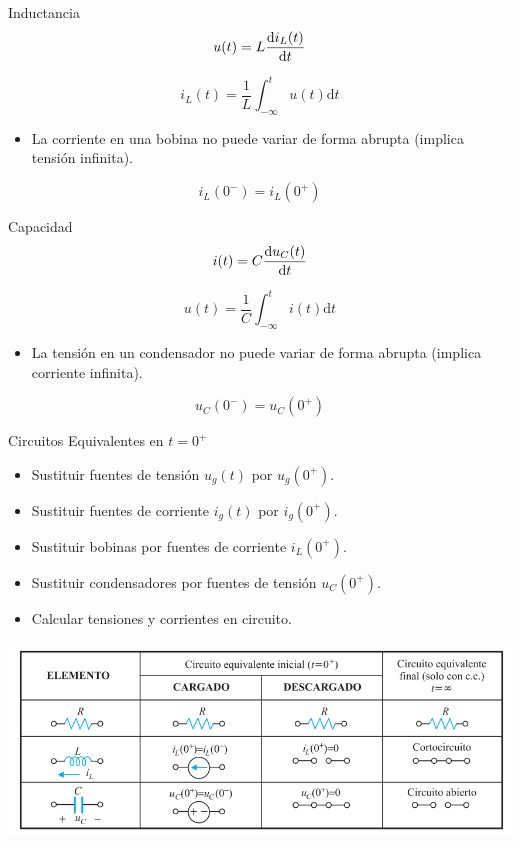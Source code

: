 \documentclass[aspectratio=169, usenames,svgnames,dvipsnames]{beamer}
\begin{document}
\begin{frame}[label={sec:orgce14b8c}]{Inductancia}
\[
u(t) = L \diff{i_L(t)}{t}
\]

\[
i_L(t) = \frac{1}{L} \int^t_{-\infty}u(t) \mathrm{d}t
\]

\begin{itemize}
\item La corriente en una bobina no puede variar de forma abrupta (implica tensión infinita).
\end{itemize}
\[
i_L(0^-) = i_L(0^+)
\]
\end{frame}

\begin{frame}[label={sec:orge9e766b}]{Capacidad}
\[
i(t) = C \diff{u_C(t)}{t}
\]

\[
u(t) = \frac{1}{C} \int^t_{-\infty}i(t) \mathrm{d}t
\]

\begin{itemize}
\item La tensión en un condensador no puede variar de forma abrupta (implica corriente infinita).
\end{itemize}
\[
u_C(0^-) = u_C(0^+)
\]
\end{frame}
\begin{frame}[label={sec:orgc327838}]{Circuitos Equivalentes en \(t = 0^+\)}
\begin{itemize}
\item Sustituir fuentes de tensión \(u_g(t)\) por \(u_g(0^+)\).
\item Sustituir fuentes de corriente \(i_g(t)\) por \(i_g(0^+)\).
\item Sustituir bobinas por fuentes de corriente \(i_L(0^+)\).
\item Sustituir condensadores por fuentes de tensión \(u_C(0^+)\).
\item Calcular tensiones y corrientes en circuito.
\end{itemize}
\begin{center}
\includegraphics[width=.9\linewidth]{../figs/CondicionesIniciales_CircuitosEquivalentes.pdf}
\end{center}
\end{frame}
\end{document}
